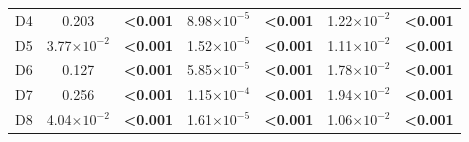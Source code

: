 \documentclass[12pt]{article}
\begin{document}
\begin{spacing}{2.0}
\begin{table}[h!]
\begin{tabular}{l | c c c c c c }
        D4	&	0.203	&	\textbf{\textless0.001}	&	8.98$\times10^{-5}$	&	\textbf{\textless0.001}	&	1.22$\times10^{-2}$	&	\textbf{\textless0.001}	\\
        D5	&	3.77$\times10^{-2}$	&	\textbf{\textless0.001}	&	1.52$\times10^{-5}$	&	\textbf{\textless0.001}	&	1.11$\times10^{-2}$	&	\textbf{\textless0.001}	\\
        D6	&	0.127	&	\textbf{\textless0.001}	&	5.85$\times10^{-5}$	&	\textbf{\textless0.001}	&	1.78$\times10^{-2}$	&	\textbf{\textless0.001}	\\
        D7	&	0.256	&	\textbf{\textless0.001}	&	1.15$\times10^{-4}$	&	\textbf{\textless0.001}	&	1.94$\times10^{-2}$	&	\textbf{\textless0.001}	\\
        D8	&	4.04$\times10^{-2}$	&	\textbf{\textless0.001}	&	1.61$\times10^{-5}$	&	\textbf{\textless0.001}	&	1.06$\times10^{-2}$	&	\textbf{\textless0.001}	\\
        \hline
        \end{tabular}
        \end{table}



\end{spacing}
\end{document}
